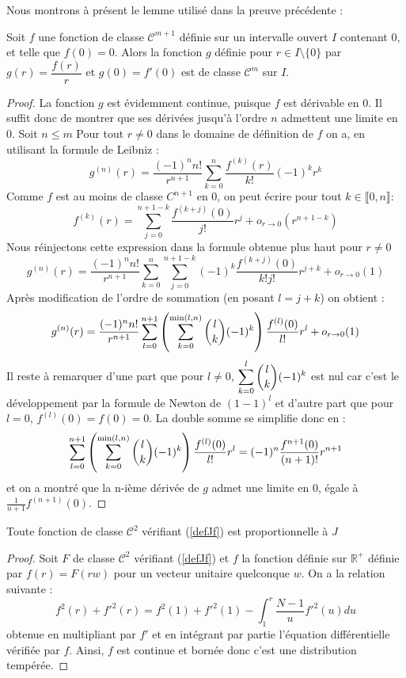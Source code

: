 \documentclass[11pt,a4paper]{article}
\begin{document}
Nous montrons à présent le lemme utilisé dans la preuve précédente : 

\begin{Lem} Soit $f$ une fonction de classe $\mathcal{C}^{m+1}$ définie sur un intervalle ouvert $I$ contenant 0, et telle que $f(0) = 0$. Alors la fonction $g$ définie pour  $r\in I\setminus{\{0\}}$ par $g(r) = \dfrac{f(r)}{r}$ et $g(0) = f'(0)$ est de classe $\mathcal{C}^m$ sur $I$. 
\begin{proof} La fonction $g$ est évidemment continue, puisque $f$ est dérivable en $0$. Il suffit donc de montrer que ses dérivées jusqu'à l'ordre $n$ admettent une limite en $0$. Soit $n\leq m$
Pour tout $r \neq 0$ dans le domaine de définition de $f$ on a, en utilisant la formule de Leibniz :
\[ g^{(n)}(r) = \dfrac{(-1)^n n!}{r^{n+1}}\sum_{k=0}^{n}\dfrac{f^{(k)}(r)}{k!}(-1)^k r^k\]
Comme $f$ est au moins de classe $C^{n+1}$ en 0, on peut écrire pour tout $k \in  \llbracket0,n \rrbracket$: \[f^{(k)}(r) = \sum_{j=0}^{n+1-k} \dfrac{f^{(k+j)}(0)}{j!}r^j + o_{r\to0}(r^{n+1-k})\] Nous réinjectons cette expression dans la formule obtenue plus haut pour $r\neq 0$ 
\[ g^{(n)}(r) = \dfrac{(-1)^n n!}{r^{n+1}}\sum_{k=0}^{n}\sum_{j=0}^{n+1-k} (-1)^k \dfrac{f^{(k+j)}(0)}{k!j!}r^{j+k} + o_{r\to0}(1)\]
Après modification de l'ordre de sommation (en posant $l=j+k$) on obtient :
\[ g^{(n)}(r) = \dfrac{(-1)^n n!}{r^{n+1}}\sum_{l=0}^{n+1}\left(\sum_{k=0}^{\min(l,n)} \dbinom{l}{k} (-1)^k\right)\dfrac{f^{(l)}(0)}{l!}r^{l}   + o_{r\to0}(1)\]
Il reste à remarquer d'une part que pour $l\neq 0$, $\displaystyle\sum_{k=0}^l \dbinom{l}{k} (-1)^k$ est nul car c'est le développement par la formule de Newton de $(1-1)^l$ et d'autre part que pour $l=0$, $f^{(l)}(0) = f(0) = 0$. La double somme se simplifie donc en : 
\[\sum_{l=0}^{n+1}\left(\sum_{k=0}^{\min(l,n)} \dbinom{l}{k} (-1)^k\right)\dfrac{f^{(l)}(0)}{l!}r^{l} = (-1)^{n} \dfrac{f^{n+1}(0)}{(n+1)!}r^{n+1}\]
et on a montré que la n-ième dérivée de $g$ admet une limite en 0, égale à $\frac{1}{n+1}f^{(n+1)}(0)$. 
\end{proof}
\label{lemmefrsurr}
\end{Lem}

\begin{Cor}\label{corPropJ} 
Toute fonction de classe $\mathcal{C}^2$ vérifiant (\ref{defJf}) est proportionnelle à $J$
\begin{proof}
Soit $F$ de classe $\mathcal{C}^2$ vérifiant (\ref{defJf}) et $f$ la fonction définie sur $\mathbb{R}^+$ définie par $f(r) = F(rw)$ pour un vecteur unitaire quelconque $w$. On a la relation suivante : \[f^2(r) + f'^2(r) = f^2(1) + f'^2(1) - \int_{1}^r \dfrac{N-1}{u} f'^2(u)du\]
obtenue en multipliant par $f'$ et en intégrant par partie l'équation différentielle vérifiée par $f$. Ainsi, $f$ est continue et bornée donc c'est une distribution tempérée. 
\end{proof}
\end{Cor}
\end{document}
